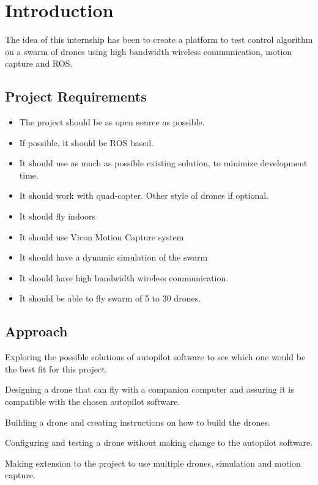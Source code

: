 \chapter{Introduction}

The idea of this internship has been to create a platform to test control algorithm on a swarm of drones using high bandwidth wireless communication, motion capture and ROS.

\section{Project Requirements}
\begin{itemize}
    \item The project should be as open source as possible.
    \item If possible, it should be ROS based.
    \item It should use as much as possible existing solution, to minimize development time.
    \item It should work with quad-copter. Other style of drones if optional.
    \item It should fly indoors
    \item It should use Vicon Motion Capture system
    \item It should have a dynamic simulation of the swarm
    \item It should have high bandwidth wireless communication.
    \item It should be able to fly swarm of 5 to 30 drones.
\end{itemize}

\section{Approach}
Exploring the possible solutions of autopilot software to see which one would be the best fit for this project.

Designing a drone that can fly with a companion computer and assuring it is compatible with the chosen autopilot software.

Building a drone and creating instructions on how to build the drones.

Configuring and testing a drone without making change to the autopilot software.

Making extension to the project to use multiple drones, simulation and motion capture.
